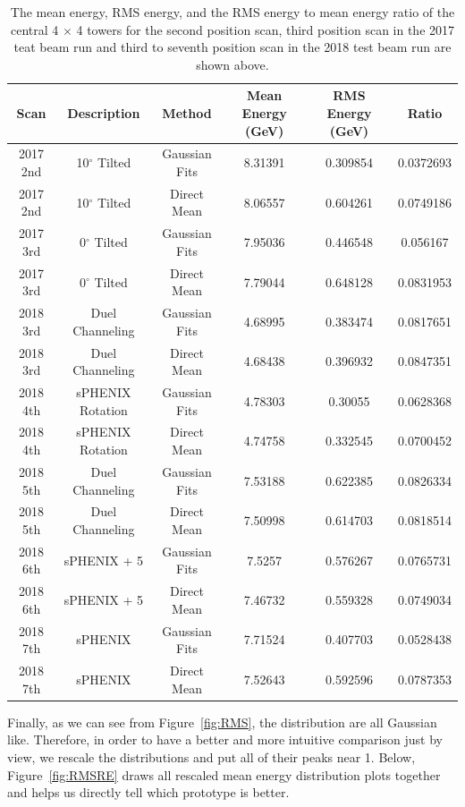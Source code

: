 \documentclass[hidelinks,11pt]{article}
\numberwithin{figure}{section}
\numberwithin{table}{section}
\newcommand{\degree}{\mbox{$^\circ$}\xspace}
\begin{document}
\begin{table}[h]
\centering
\begin{tabular}{|c|c|c|c|c|c|}
\hline
Scan & Description & Method  & Mean Energy (GeV) & RMS Energy (GeV) & Ratio  \\
\hline
2017 2nd & 10\degree Tilted & Gaussian Fits & 8.31391 & 0.309854 & 0.0372693 \\
\hline
2017 2nd & 10\degree Tilted & Direct Mean & 8.06557 & 0.604261 & 0.0749186 \\
\hline
2017 3rd & 0\degree Tilted & Gaussian Fits & 7.95036 & 0.446548 & 0.056167 \\
\hline
2017 3rd & 0\degree Tilted & Direct Mean & 7.79044 & 0.648128 & 0.0831953 \\
\hline
2018 3rd & Duel Channeling & Gaussian Fits & 4.68995 & 0.383474 & 0.0817651 \\
\hline
2018 3rd & Duel Channeling  & Direct Mean & 4.68438 & 0.396932 & 0.0847351 \\
\hline
2018 4th & sPHENIX Rotation & Gaussian Fits & 4.78303 & 0.30055 & 0.0628368 \\
\hline
2018 4th & sPHENIX Rotation  & Direct Mean & 4.74758 & 0.332545 & 0.0700452 \\
\hline
2018 5th & Duel Channeling & Gaussian Fits & 7.53188 & 0.622385 & 0.0826334 \\
\hline
2018 5th &  Duel Channeling    & Direct Mean & 7.50998 & 0.614703 & 0.0818514 \\
\hline
2018 6th & sPHENIX + 5 & Gaussian Fits & 7.5257 & 0.576267 & 0.0765731 \\
\hline
2018 6th &   sPHENIX + 5    & Direct Mean & 7.46732 & 0.559328 & 0.0749034 \\
\hline
2018 7th & sPHENIX  & Gaussian Fits & 7.71524 & 0.407703 & 0.0528438 \\
\hline
2018 7th &   sPHENIX   & Direct Mean & 7.52643 & 0.592596 & 0.0787353 \\ 
\hline
\end{tabular}
\caption{The mean energy, RMS energy, and the RMS energy to mean energy ratio of the central 4 $\times$ 4 towers for the second position scan, third position scan in the 2017 teat beam run and third to seventh position scan in the 2018 test beam run are shown above.}
\label{tab:RMSTable}
\end{table}




Finally, as we can see from Figure~\ref{fig:RMS}, the distribution are all Gaussian like. Therefore, in order to have a better and more intuitive comparison just by view, we rescale the distributions and put all of their peaks near 1. Below, Figure~\ref{fig:RMSRE} draws all rescaled mean energy distribution plots together and helps us directly tell which prototype is better.
\end{document}
